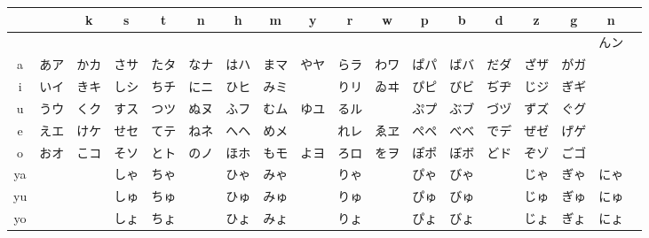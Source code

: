 \documentclass{article}
\begin{document}
\begin{CJK}{UTF8}{min}
\begin{center}\Large
	\begin{tabular}{c|ccccccccccccccccc}
			&	&k	&s	&t	&n	&h	&m	&y	&r	&w	&p	&b	&d	&z	&g	&n	\\
		\hline
			&	&	&	&	&	&	&	&	&	&	&	&	&	&	&	    &んン	\\
		a	&あア	&かカ	&さサ	&たタ	&なナ	&はハ	&まマ	&やヤ	&らラ	&わワ	&ぱパ	&ばバ	&だダ	&ざザ	&がガ	&	\\
		i	&いイ	&きキ	&しシ	&ちチ	&にニ	&ひヒ	&みミ	&	    &りリ	&ゐヰ	&ぴピ	&びビ	&ぢヂ	&じジ	&ぎギ	&	\\
		u	&うウ	&くク	&すス	&つツ	&ぬヌ	&ふフ	&むム	&ゆユ	&るル	&	    &ぷプ	&ぶブ	&づヅ	&ずズ	&ぐグ	&	\\
		e	&えエ	&けケ	&せセ	&てテ	&ねネ	&へヘ	&めメ	&	    &れレ	&ゑヱ	&ぺペ	&べベ	&でデ	&ぜゼ	&げゲ	&	\\
		o	&おオ	&こコ	&そソ	&とト	&のノ	&ほホ	&もモ	&よヨ	&ろロ	&をヲ	&ぽポ	&ぼボ	&どド	&ぞゾ	&ごゴ	&	\\
		ya	&	&	&しゃ	&ちゃ	&	    &ひゃ	&みゃ	&	    &りゃ	&	    &ぴゃ	&びゃ	&	    &じゃ	&ぎゃ	&にゃ	\\
		yu	&	&	&しゅ	&ちゅ	&	    &ひゅ	&みゅ	&	    &りゅ	&	    &ぴゅ	&びゅ	&	    &じゅ	&ぎゅ	&にゅ	\\
		yo	&	&	&しょ	&ちょ	&	    &ひょ	&みょ	&	    &りょ	&	    &ぴょ	&びょ	&	    &じょ	&ぎょ	&にょ
	\end{tabular}
\end{center}
\end{CJK}
\end{document}
